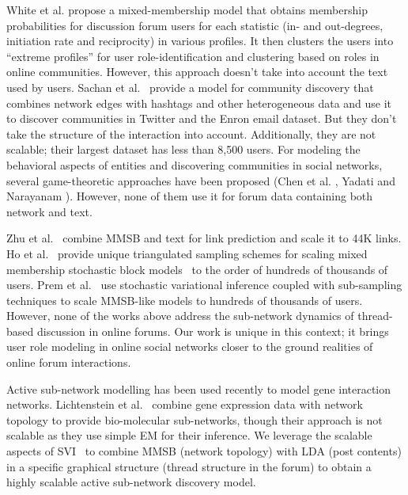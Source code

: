 \documentclass{sig-alternate}
\begin{document}
White et al.\cite{ICWSM124638} propose a mixed-membership model that obtains
membership probabilities for discussion forum users for each statistic
(in- and out-degrees, initiation rate and reciprocity) in various profiles. It
then 
clusters the users into ``extreme profiles'' for user role-identification
and clustering based on roles in online communities. However, this approach
doesn't take into account the text used by users.
Sachan et
al.~\cite{Sachan:2012:UCI:2187836.2187882} provide a model for community
discovery that combines network edges with hashtags and other heterogeneous data
and use it to discover communities in Twitter and the Enron email dataset. But they
don't take the structure of the interaction into account. Additionally, they are 
not scalable; their largest dataset has less than 8,500 users.
For modeling the behavioral aspects of entities and
discovering communities in social networks, several game-theoretic approaches
have been proposed (Chen et al. \cite{Chen:2010:GFI:1842547.1842566}, Yadati and
Narayanam \cite{Yadati:2011:GTM:1963192.1963316}). However, none of them use it for
forum data containing both network and text. 

Zhu et
al.~\cite{Zhu:getoor:MMSB-text} combine MMSB and text for link prediction and
scale it to 44K links.
Ho et al.~\cite{HoYX12} provide  unique triangulated sampling schemes for scaling
mixed membership stochastic block models~\cite{Airoldi:2008:MMS:1390681.1442798} to
the order of hundreds of thousands of users. Prem et
al.~\cite{conf/nips/GopalanMGFB12} use stochastic variational inference 
coupled with sub-sampling techniques to
scale MMSB-like models to hundreds of thousands of users.
However, none of the works above address the sub-network dynamics of thread-based
discussion in online forums. Our work is unique in this context; it
brings user role modeling in online social networks closer to the
ground realities of online forum interactions.

Active sub-network modelling has been used recently to model gene interaction 
networks. Lichtenstein et al.~\cite{Lichtenstein:Charleston}
combine gene expression data with network topology to provide bio-molecular 
sub-networks, though their approach is not scalable as they use simple EM for
their inference. We leverage the scalable aspects of
SVI~\cite{Hoffman:2013:SVI} to combine MMSB (network topology) with LDA (post
contents) in a specific graphical structure (thread structure in the forum) to
obtain a highly scalable active sub-network discovery model.
\end{document}
